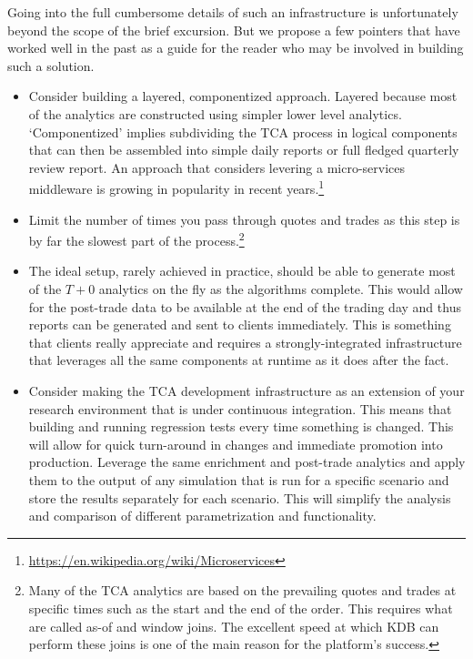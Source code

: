 Going into the full cumbersome details of such an infrastructure is unfortunately beyond the scope of the brief excursion. But we propose a few pointers that have worked well in the past as a guide for the reader who may be involved in building such a solution.

\begin{itemize}
\item Consider building a layered, componentized approach. Layered because most of the analytics are constructed using simpler lower level analytics. `Componentized' implies subdividing the TCA process in logical components that can then be assembled into simple daily reports or full fledged quarterly review report. An approach that considers levering a micro-services middleware is growing in popularity in recent years.\footnote{\url{https://en.wikipedia.org/wiki/Microservices}}

\item Limit the number of times you pass through quotes and trades as this step is by far the slowest part of the process.\footnote{Many of the TCA analytics are based on the prevailing quotes and trades at specific times such as the start and the end of the order. This requires what are called  as-of and window joins. The excellent speed at which KDB can perform these joins is one of the main reason for the platform's success.}

\item The ideal setup, rarely achieved in practice, should be able to generate most of the $T+0$ analytics on the fly as the algorithms complete. This would allow for the post-trade data to be available at the end of the trading day and thus reports can be generated and sent to clients immediately. This is something that clients really appreciate and requires a strongly-integrated infrastructure that leverages all the same components at runtime as it does after the fact. 

\item Consider making the TCA development infrastructure as an extension of your research environment that is under continuous integration. This means that building and running regression tests every time something is changed. This will allow for quick turn-around in changes and immediate promotion into production. Leverage the same enrichment and post-trade analytics and apply them to the output of any simulation that is run for a specific scenario and store the results separately for each scenario. This will simplify the analysis and comparison of different parametrization and functionality.


\end{itemize}
